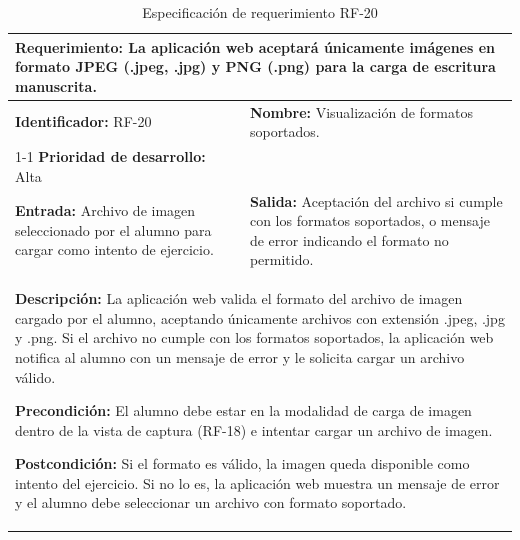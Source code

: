 \begin{table}[H]
\caption{Especificación de requerimiento RF-20}
\centering
\renewcommand{\arraystretch}{1.3}
\setlength{\tabcolsep}{6pt}
\begin{tabular}{|p{7cm}|p{8cm}|}
\hline
\multicolumn{2}{|p{15cm}|}{\textbf{Requerimiento:} La aplicación web aceptará únicamente imágenes en formato JPEG (.jpeg, .jpg) y PNG (.png) para la carga de escritura manuscrita.} \\ \hline
\textbf{Identificador:} RF-20 &
\textbf{Nombre:} Visualización de formatos soportados. \\ \cline{1-1}
\textbf{Prioridad de desarrollo:} Alta &
\multicolumn{1}{p{8cm}|}{} \\ \hline
\textbf{Entrada:} Archivo de imagen seleccionado por el alumno para cargar como intento de ejercicio. &
\textbf{Salida:} Aceptación del archivo si cumple con los formatos soportados, o mensaje de error indicando el formato no permitido. \\ \hline
\multicolumn{2}{|p{15cm}|}{
\textbf{Descripción:} La aplicación web valida el formato del archivo de imagen cargado por el alumno, aceptando únicamente archivos con extensión .jpeg, .jpg y .png. Si el archivo no cumple con los formatos soportados, la aplicación web notifica al alumno con un mensaje de error y le solicita cargar un archivo válido.

\vspace{0.2cm}
\textbf{Precondición:} El alumno debe estar en la modalidad de carga de imagen dentro de la vista de captura (RF-18) e intentar cargar un archivo de imagen.

\vspace{0.2cm}
\textbf{Postcondición:} Si el formato es válido, la imagen queda disponible como intento del ejercicio. Si no lo es, la aplicación web muestra un mensaje de error y el alumno debe seleccionar un archivo con formato soportado.
} \\ \hline
\end{tabular}
\label{tab:rf20}
\end{table}

